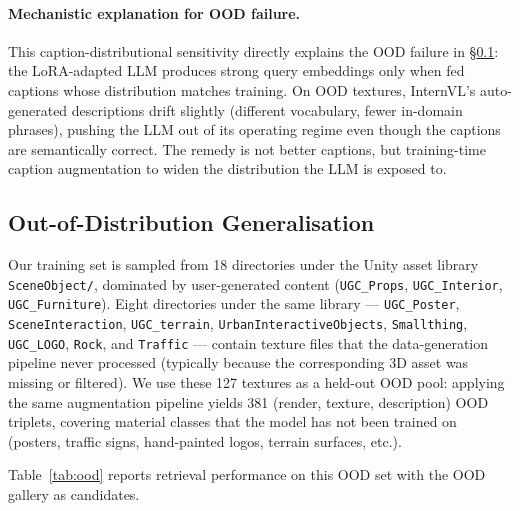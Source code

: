\documentclass[10pt,twocolumn]{article}
\begin{document}
\paragraph{Mechanistic explanation for OOD failure.}
This caption-distributional sensitivity directly explains the OOD failure
in \S\ref{sec:ood}: the LoRA-adapted LLM produces strong query embeddings
only when fed captions whose distribution matches training.
On OOD textures, InternVL's auto-generated descriptions drift slightly
(different vocabulary, fewer in-domain phrases), pushing the LLM out of
its operating regime even though the captions are semantically correct.
The remedy is not better captions, but training-time caption augmentation
to widen the distribution the LLM is exposed to.

\subsection{Out-of-Distribution Generalisation}
\label{sec:ood}

Our training set is sampled from 18 directories under the Unity asset library
\texttt{SceneObject/}, dominated by user-generated content
(\texttt{UGC\_Props}, \texttt{UGC\_Interior}, \texttt{UGC\_Furniture}).
Eight directories under the same library --- \texttt{UGC\_Poster},
\texttt{SceneInteraction}, \texttt{UGC\_terrain},
\texttt{UrbanInteractiveObjects}, \texttt{Smallthing}, \texttt{UGC\_LOGO},
\texttt{Rock}, and \texttt{Traffic} --- contain texture files that the
data-generation pipeline never processed (typically because the corresponding
3D asset was missing or filtered).
We use these 127 textures as a held-out OOD pool: applying the same
augmentation pipeline yields 381 (render, texture, description) OOD triplets,
covering material classes that the model has not been trained on
(posters, traffic signs, hand-painted logos, terrain surfaces, etc.).

Table~\ref{tab:ood} reports retrieval performance on this OOD set with the
OOD gallery as candidates.

\begin{table}[h]
\centering
\caption{Out-of-distribution evaluation on 381 OOD triplets drawn from 8
         held-out asset categories. \emph{Stage 2 multimodal degrades
         substantially on OOD textures, while Stage 1 visual retains much of
         its in-domain capability.}}
\label{tab:ood}
\end{table}
\end{document}
